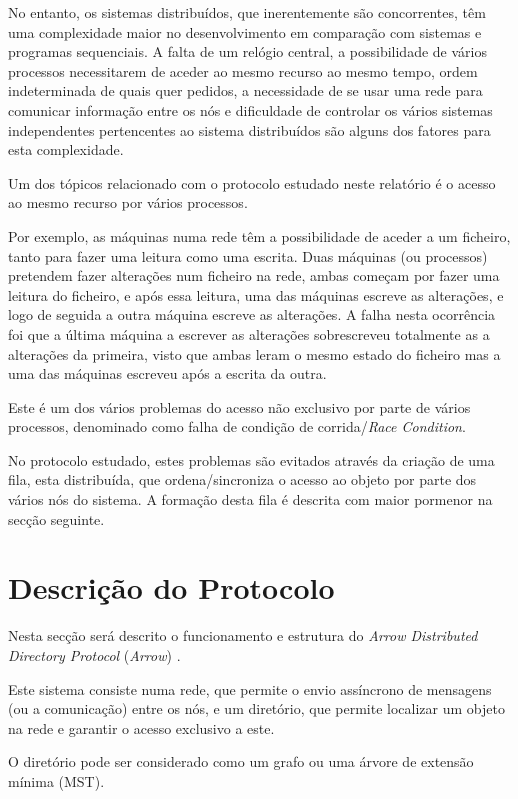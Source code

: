 No entanto, os sistemas distribuídos, que inerentemente são concorrentes, têm uma complexidade maior no desenvolvimento em comparação com sistemas e programas sequenciais.
A falta de um relógio central, a possibilidade de vários processos necessitarem de aceder ao mesmo recurso ao mesmo tempo, ordem indeterminada de quais quer pedidos, a necessidade de se usar uma rede para comunicar informação entre os nós e dificuldade de controlar os vários sistemas independentes pertencentes ao sistema distribuídos são alguns dos fatores para esta complexidade.

Um dos tópicos relacionado com o protocolo estudado neste relatório é o acesso ao mesmo recurso por vários processos.

Por exemplo, as máquinas numa rede têm a possibilidade de aceder a um ficheiro, tanto para fazer uma leitura como uma escrita.
Duas máquinas (ou processos) pretendem fazer alterações num ficheiro na rede, ambas começam por fazer uma leitura do ficheiro, e após essa leitura, uma das máquinas escreve as alterações, e logo de seguida a outra máquina escreve as alterações. A falha nesta ocorrência foi que a última máquina a escrever as alterações sobrescreveu totalmente as a alterações da primeira, visto que ambas leram o mesmo estado do ficheiro mas a uma das máquinas escreveu após a escrita da outra.

Este é um dos vários problemas do acesso não exclusivo por parte de vários processos, denominado como falha de condição de corrida/\emph{Race Condition}.

No protocolo estudado, estes problemas são evitados através da criação de uma fila, esta distribuída, que ordena/sincroniza o acesso ao objeto por parte dos vários nós do sistema.
A formação desta fila é descrita com maior pormenor na secção seguinte. 

\section{Descrição do Protocolo}

Nesta secção será descrito o funcionamento e estrutura do \textit{Arrow Distributed Directory Protocol} (\emph{Arrow}) \cite{Arrow}. 

Este sistema consiste numa rede, que permite o envio assíncrono de mensagens (ou a comunicação) entre os nós, e um diretório, que permite localizar um objeto na rede e garantir o acesso exclusivo a este. 

O diretório pode ser considerado como um grafo ou uma árvore de extensão mínima (\acs{MST}).

